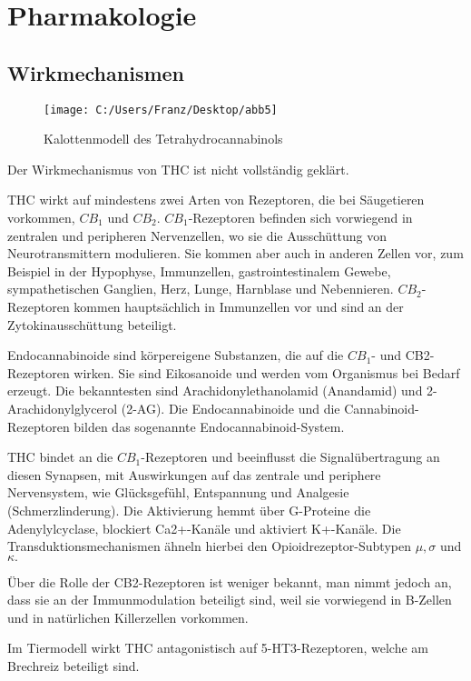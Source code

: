 \documentclass[openany]{scrbook}
\begin{document}
\section{Pharmakologie}	
\subsection{Wirkmechanismen}

\begin{figure}[h]
	\centering
	\texttt{[image: C:/Users/Franz/Desktop/abb5]}
	\caption{Kalottenmodell des Tetrahydrocannabinols}
	\label{fig:800px-Tetrahydrocannabinol-3D-vdW}
\end{figure}

		Der Wirkmechanismus von THC ist nicht vollständig geklärt.
		
		THC wirkt auf mindestens zwei Arten von Rezeptoren, die bei Säugetieren vorkommen, $CB_1$ und $CB_2$. $CB_1$-Rezeptoren befinden sich vorwiegend in zentralen und peripheren Nervenzellen, wo sie die Ausschüttung von Neurotransmittern modulieren. Sie kommen aber auch in anderen Zellen vor, zum Beispiel in der Hypophyse, Immunzellen, gastrointestinalem Gewebe, sympathetischen Ganglien, Herz, Lunge, Harnblase und Nebennieren. $CB_2$-Rezeptoren kommen hauptsächlich in Immunzellen vor und sind an der Zytokinausschüttung beteiligt.
		
		Endocannabinoide sind körpereigene Substanzen, die auf die $CB_1$- und CB2-Rezeptoren wirken. Sie sind Eikosanoide und werden vom Organismus bei Bedarf erzeugt. Die bekanntesten sind Arachidonylethanolamid (Anandamid) und 2-Arachidonylglycerol (2-AG). Die Endocannabinoide und die Cannabinoid-Rezeptoren bilden das sogenannte Endocannabinoid-System.
		
		THC bindet an die $CB_1$-Rezeptoren und beeinflusst die Signalübertragung an diesen Synapsen, mit Auswirkungen auf das zentrale und periphere Nervensystem, wie Glücksgefühl, Entspannung und Analgesie (Schmerzlinderung). Die Aktivierung hemmt über G-Proteine die Adenylylcyclase, blockiert Ca2+-Kanäle und aktiviert K+-Kanäle. Die Transduktionsmechanismen ähneln hierbei den Opioidrezeptor-Subtypen $\mu,\sigma$ und $\kappa.$
		
		Über die Rolle der CB2-Rezeptoren ist weniger bekannt, man nimmt jedoch an, dass sie an der Immunmodulation beteiligt sind, weil sie vorwiegend in B-Zellen und in natürlichen Killerzellen vorkommen.
		
		Im Tiermodell wirkt THC antagonistisch auf 5-HT3-Rezeptoren, welche am Brechreiz beteiligt sind.
		
\end{document}
